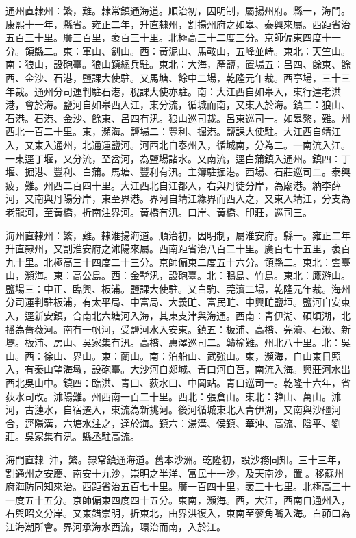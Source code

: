 \begin{pinyinscope}
通州直隸州：繁，難。隸常鎮通海道。順治初，因明制，屬揚州府。縣一，海門。康熙十一年，縣省。雍正二年，升直隸州，割揚州府之如皋、泰興來屬。西距省治五百三十里。廣三百里，袤百三十里。北極高三十二度三分。京師偏東四度十一分。領縣二。東：軍山、劍山。西：黃泥山、馬鞍山，五峰並峙。東北：天竺山。南：狼山，設砲臺。狼山鎮總兵駐。東北：大海，產鹽，置場五：呂四、餘東、餘西、金沙、石港，鹽課大使駐。又馬塘、餘中二場，乾隆元年裁。西亭場，三十三年裁。通州分司運判駐石港，稅課大使亦駐。南：大江西自如皋入，東行達老洪港，會於海。鹽河自如皋西入江，東分流，循城而南，又東入於海。鎮二：狼山、石港。石港、金沙、餘東、呂四有汛。狼山巡司裁。呂東巡司一。如皋繁，難。州西北一百二十里。東，瀕海。鹽場二：豐利、掘港。鹽課大使駐。大江西自靖江入，又東入通州，北通運鹽河。河西北自泰州入，循城南，分為二。一南流入江。一東逕丁堰，又分流，至岔河，為鹽場諸水。又南流，逕白蒲鎮入通州。鎮四：丁堰、掘港、豐利、白蒲。馬塘、豐利有汛。主簿駐掘港。西場、石莊巡司二。泰興疲，難。州西二百四十里。大江西北自江都入，右與丹徒分岸，為廟港。納李薛河，又南與丹陽分岸，東至界港。界河自靖江緣界而西入之，又東入靖江，分支為老龍河，至黃橋，折南注界河。黃橋有汛。口岸、黃橋、印莊，巡司三。

海州直隸州：繁，難。隸淮揚海道。順治初，因明制，屬淮安府。縣一。雍正二年升直隸州，又割淮安府之沭陽來屬。西南距省治八百二十里。廣百七十五里，袤百九十里。北極高三十四度二十三分。京師偏東二度五十六分。領縣二。東北：雲臺山，瀕海。東：高公島。西：金墅汛，設砲臺。北：鴨島、竹島。東北：鷹游山。鹽場三：中正、臨興、板浦。鹽課大使駐。又白駒、莞瀆二場，乾隆元年裁。海州分司運判駐板浦，有太平局、中富局、大義甿、富民甿、中興甿鹽垣。鹽河自安東入，逕新安鎮，合南北六塘河入海，其東支津與海通。西南：青伊湖、碩頃湖，北播為薔薇河。南有一帆河，受鹽河水入安東。鎮五：板浦、高橋、莞瀆、石湫、新壩。板浦、房山、吳家集有汛。高橋、惠澤巡司二。贛榆難。州北八十里。北：吳山。西：徐山、界山。東：蘭山。南：泊船山、武強山。東，瀕海，自山東日照入，有秦山望海墩，設砲臺。大沙河自郯城、青口河自莒，南流入海。興莊河水出西北吳山中。鎮四：臨洪、青口、荻水口、中岡站。青口巡司一。乾隆十六年，省荻水司改。沭陽難。州西南一百二十里。西北：張倉山。東北：韓山、萬山。沭河，古漣水，自宿遷入，東流為新挑河。後河循城東北入青伊湖，又南與沙礓河合，逕陽溝，六塘水注之，達於海。鎮六：湯溝、侯鎮、華沖、高流、陰平、劉莊。吳家集有汛。縣丞駐高流。

海門直隸：沖，繁。隸常鎮通海道。舊本沙洲。乾隆初，設沙務同知。三十三年，割通州之安慶、南安十九沙，崇明之半洋、富民十一沙，及天南沙，置。移蘇州府海防同知來治。西距省治五百七十里。廣一百四十里，袤三十七里。北極高三十一度五十五分。京師偏東四度四十五分。東南，瀕海。西，大江，西南自通州入，右與昭文分岸。又東錯崇明，折東北，由界洪復入，東南至蓼角嘴入海。白茆口為江海潮所會。界河承海水西流，環治而南，入於江。


\end{pinyinscope}
